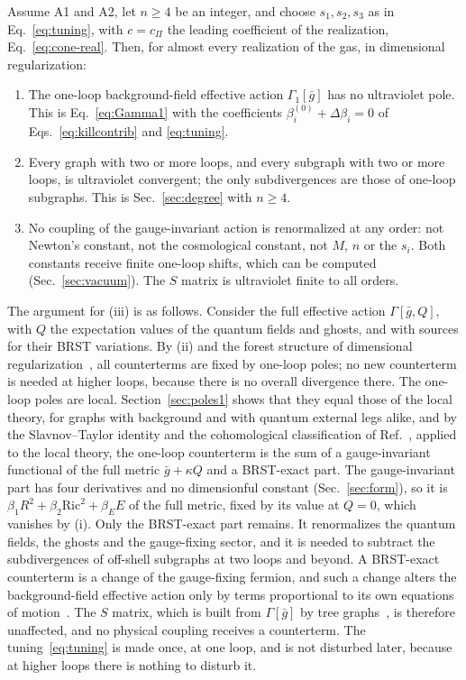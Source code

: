 \documentclass[a4paper,11pt]{article}
\newcommand{\Ric}{\mathrm{Ric}}
\begin{document}
Assume A1 and A2, let $n\ge4$ be an integer, and choose $s_1,s_2,s_3$ as in Eq.~\eqref{eq:tuning}, with $c=c_\Pi$ the leading coefficient of the realization, Eq.~\eqref{eq:cone-real}. Then, for almost every realization of the gas, in dimensional regularization:
\begin{enumerate}[label=\textup{(\roman*)},leftmargin=2.2em,itemsep=0.2em]
\item The one-loop background-field effective action $\Gamma_1[\bar g]$ has no ultraviolet pole. This is Eq.~\eqref{eq:Gamma1} with the coefficients $\beta_i^{(0)}+\Delta\beta_i=0$ of Eqs.~\eqref{eq:killcontrib} and \eqref{eq:tuning}.
\item Every graph with two or more loops, and every subgraph with two or more loops, is ultraviolet convergent; the only subdivergences are those of one-loop subgraphs. This is Sec.~\ref{sec:degree} with $n\ge4$.
\item No coupling of the gauge-invariant action is renormalized at any order: not Newton's constant, not the cosmological constant, not $M$, $n$ or the $s_i$. Both constants receive finite one-loop shifts, which can be computed (Sec.~\ref{sec:vacuum}). The $S$ matrix is ultraviolet finite to all orders.
\end{enumerate}
The argument for (iii) is as follows. Consider the full effective action $\Gamma[\bar g,Q]$, with $Q$ the expectation values of the quantum fields and ghosts, and with sources for their BRST variations. By (ii) and the forest structure of dimensional regularization~\cite{Collins1984}, all counterterms are fixed by one-loop poles; no new counterterm is needed at higher loops, because there is no overall divergence there. The one-loop poles are local. Section~\ref{sec:poles1} shows that they equal those of the local theory, for graphs with background and with quantum external legs alike, and by the Slavnov--Taylor identity and the cohomological classification of Ref.~\cite{BarnichBrandtHenneaux2000}, applied to the local theory, the one-loop counterterm is the sum of a gauge-invariant functional of the full metric $\bar g+\kappa Q$ and a BRST-exact part. The gauge-invariant part has four derivatives and no dimensionful constant (Sec.~\ref{sec:form}), so it is $\beta_1R^2+\beta_2\Ric^2+\beta_EE$ of the full metric, fixed by its value at $Q=0$, which vanishes by (i). Only the BRST-exact part remains. It renormalizes the quantum fields, the ghosts and the gauge-fixing sector, and it is needed to subtract the subdivergences of off-shell subgraphs at two loops and beyond. A BRST-exact counterterm is a change of the gauge-fixing fermion, and such a change alters the background-field effective action only by terms proportional to its own equations of motion~\cite{KalloshTarasovTyutin1978,BarnichBrandtHenneaux2000}. The $S$ matrix, which is built from $\Gamma[\bar g]$ by tree graphs~\cite{AbbottGrisaruSchaefer1983}, is therefore unaffected, and no physical coupling receives a counterterm. The tuning~\eqref{eq:tuning} is made once, at one loop, and is not disturbed later, because at higher loops there is nothing to disturb it.
\end{document}
